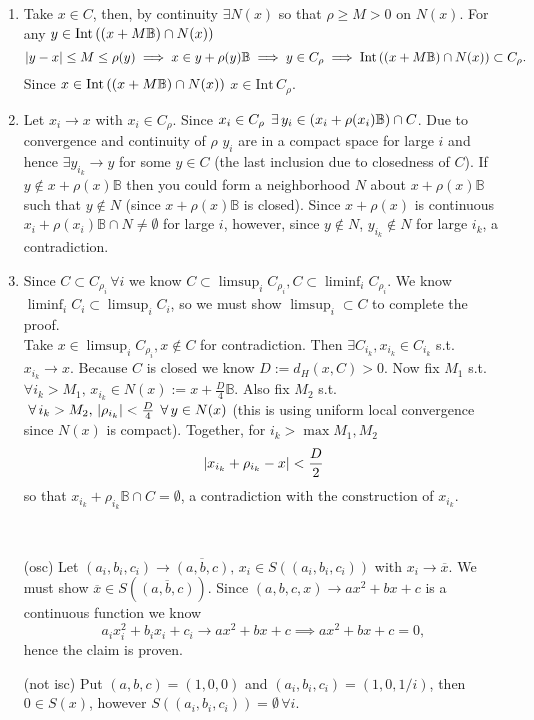 \documentclass{article}
\newenvironment{ex}[1]
  {\renewcommand\theexercise{#1}\exercise}
  {\endexercise}
\newcommand{\inte}{\mathrm{Int}\,}
\newcommand{\B}{\mathbb{B}}
\newcommand{\ik}{i_k}
\begin{document}
\begin{ex}{2.6}
  \begin{enumerate}[label=(\alph*)] \, \\
    \newcommand{\cp}{C_\rho}
    \item
      Take $x \in C$, then, by continuity $\exists N(x)$ so that $\rho \ge M > 0$ on $N(x)$. For any $y \in \inte \parens{(x + M\B) \cap N(x)}$
      $$
      \abs{y - x} \le M \le \rho(y) \implies x \in y + \rho(y)\B \implies y \in \cp \implies \inte \parens{(x + M\B) \cap N(x)} \subset \cp.
      $$
      Since $x \in \inte \parens{(x + M\B) \cap N(x)}$ $x \in \inte \cp$.
    \item
      Let $x_i \to x$ with $x_i \in \cp$. Since $x_i \in \cp \, \exists y_i \in \parens{x_i + \rho(x_i)\B} \cap C$. Due to convergence and continuity of $\rho$ $y_i$ are in a compact space for large $i$ and hence $\exists y_{i_k} \to y$ for some $y \in C$ (the last inclusion due to closedness of $C$). If $y \not\in x + \rho(x)\B$ then you could form a neighborhood $N$ about $x + \rho(x)\B$ such that $y \not\in N$ (since $x + \rho(x)\B$ is closed). Since $x + \rho(x)$ is continuous $x_i + \rho(x_i) \B \cap N \ne \emptyset$ for large $i$, however, since $y \not\in N$, $y_{i_k} \not\in N$ for large $i_k$, a contradiction.
    \item
      \newcommand{\cpi}{C_{\rho_i}}
      Since $C \subset \cpi \, \forall i$ we know $C \subset \limsup_i \cpi, C \subset \liminf_i \cpi$. We know $\liminf_i C_i \subset \limsup_i C_i$, so we must show $\limsup_i \subset C$ to complete the proof. \, \\
      Take $x \in \limsup_i \cpi, x \not\in C$ for contradiction. Then $\exists C_{\ik}, x_{\ik} \in C_{\ik}$ s.t. $x_{\ik} \to x$. Because $C$ is closed we know $D := d_H({x}, C) > 0$. Now fix $M_1$ s.t. $\forall \ik > M_1, \, x_{\ik} \in N(x) := x + \frac{D}{4}\B$. Also fix $M_2$ s.t. $\forall \ik > M_2, \, \abs{\rho_{\ik}} < \frac{D}{4} \, \forall y \in N(x)$ (this is using uniform local convergence since $N(x)$ is compact). Together, for $\ik > \max{M_1, M_2}$
      $$
      \abs{x_{\ik} + \rho_{\ik} - x} < \frac{D}{2}
      $$
      so that $x_{\ik} + \rho_{\ik}\B \cap C = \emptyset$, a contradiction with the construction of $x_{\ik}$.
  \end{enumerate}
\end{ex}
\begin{ex}{2.10} \, \\
  \begin{itemize}
    \item[(osc)]
      \newcommand{\xb}{\overline{(a, b, c)}}
      \newcommand{\yb}{\overline{x}}
      \renewcommand{\xi}{(a_i, b_i, c_i)}
      \newcommand{\yi}{x_i}
      Let $\xi \to \xb, \, \yi \in S(\xi)$ with $\yi \to \yb$. We must show $\yb \in S(\xb)$. Since $(a, b, c, x) \to a x^2 + b x + c$ is a continuous function we know
      $$
      a_i x_i^2 + b_i x_i + c_i \to a x^2 + b x + c \implies a x^2 + b x + c = 0,
      $$
      hence the claim is proven.
    \item[(not isc)] Put $(a, b, c) = (1, 0, 0)$ and $(a_i, b_i, c_i) = (1, 0, 1/i)$, then $0 \in S(x)$, however $S(\xi) = \emptyset \, \forall i$.
  \end{itemize}
\end{ex}
\end{document}
